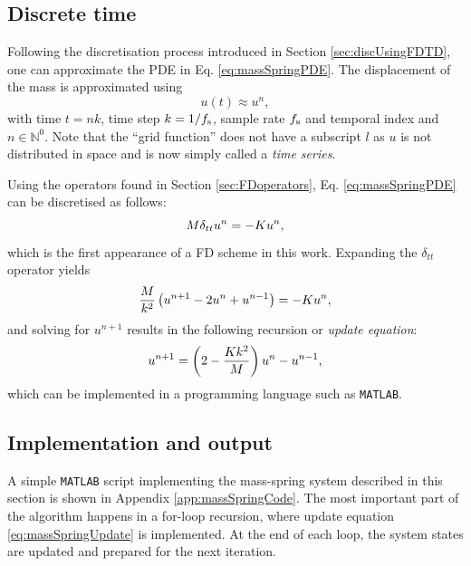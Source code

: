 \subsection{Discrete time}
Following the discretisation process introduced in Section \ref{sec:discUsingFDTD}, one can approximate the PDE in Eq. \eqref{eq:massSpringPDE}. The displacement of the mass is approximated using 
\begin{equation}
    u(t) \approx u^n,
\end{equation}
with time $t = nk$, time step $k = 1/f_\text{s}$, sample rate $f_\text{s}$ and temporal index and $n \in \mathbb{N}^0$. Note that the ``grid function'' does not have a subscript $l$ as $u$ is not distributed in space and is now simply called a \textit{time series}.

Using the operators found in Section 
\ref{sec:FDoperators}, Eq. \eqref{eq:massSpringPDE} can be discretised as follows:
\begin{equation}\label{eq:massSpringFDS}
    M \delta_{tt} u^n = -Ku^n,
\end{equation}
which is the first appearance of a FD scheme in this work. Expanding the $\delta_{tt}$ operator yields 
\begin{equation*}
    \frac{M}{k^2}\left(u^{n+1}-2u^n+u^{n-1}\right) = -Ku^n,\nonumber
\end{equation*}
and solving for $u^{n+1}$ results in the following recursion or \textit{update equation}:
\begin{equation}\label{eq:massSpringUpdate}
    u^{n+1} = \left(2-\frac{Kk^2}{M} \right)u^n - u^{n-1},
\end{equation}
which can be implemented in a programming language such as \texttt{MATLAB}. 

\subsection{Implementation and output}\label{sec:massSpringImplementation}
A simple \texttt{MATLAB} script implementing the mass-spring system described in this section is shown in Appendix \ref{app:massSpringCode}. The most important part of the algorithm happens in a for-loop recursion, where update equation \eqref{eq:massSpringUpdate} is implemented. At the end of each loop, the system states are updated and prepared for the next iteration. %

